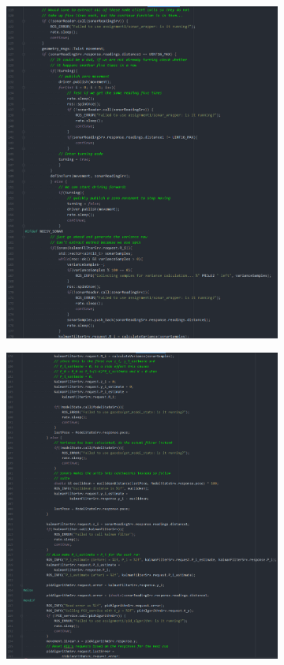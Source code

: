 \documentclass{article}
\begin{document}
\begin{figure}[ht]
    \begin{subfigure}{.5\textwidth}
        \centering
        \includegraphics[scale=0.24]{img/controller3.png}
    \end{subfigure}
    \begin{subfigure}{.5\textwidth}
        \centering
        \includegraphics[scale=0.24]{img/controller4.png}
    \end{subfigure}
\end{figure}
\end{document}
